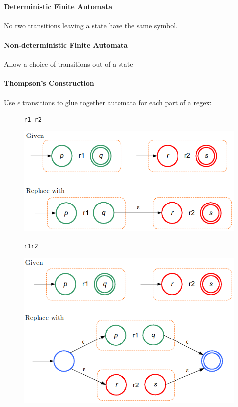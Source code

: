 \documentclass[twocolumn,english]{article}
\begin{document}
\paragraph{Deterministic Finite Automata}

No two transitions leaving a state have the same symbol.

\paragraph{Non-deterministic Finite Automata}

Allow a choice of transitions out of a state

\paragraph{Thompson's Construction}

Use $\epsilon$ transitions to glue together automata for each part
of a regex:

\begin{figure}[H]
\begin{centering}
\texttt{r1 r2}
\par\end{centering}
\centering{}\includegraphics[width=0.5\linewidth]{img/concat}
\end{figure}

\begin{figure}[H]
\begin{centering}
\texttt{r1\textbar{}r2}
\par\end{centering}
\centering{}\includegraphics[width=0.5\linewidth]{img/alternate}
\end{figure}
\end{document}

